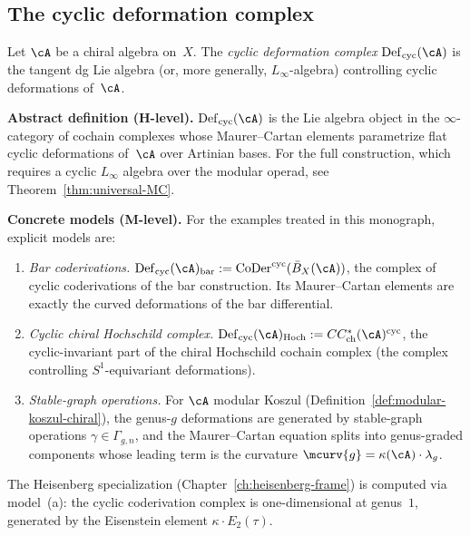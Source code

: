 \subsection{The cyclic deformation complex}
\label{subsec:cyclic-deformation}

\begin{definition}
\label{def:cyclic-deformation-elementary}
Let $\cA$ be a chiral algebra on~$X$.  The \emph{cyclic deformation
complex} $\operatorname{Def}_{\mathrm{cyc}}(\cA)$ is the tangent dg
Lie algebra (or, more generally, $L_\infty$-algebra) controlling
cyclic deformations of~$\cA$.

\smallskip\noindent
\textbf{Abstract definition (H-level).}
$\operatorname{Def}_{\mathrm{cyc}}(\cA)$ is the Lie algebra object in
the $\infty$-category of cochain complexes whose Maurer--Cartan
elements parametrize flat cyclic deformations of~$\cA$ over
Artinian bases.  For the full construction, which requires a cyclic
$L_\infty$ algebra over the modular operad, see
Theorem~\ref{thm:universal-MC}.

\smallskip\noindent
\textbf{Concrete models (M-level).}
For the examples treated in this monograph, explicit models are:

\begin{enumerate}[label=\textup{(\alph*)}]
\item \emph{Bar coderivations.}
  $\operatorname{Def}_{\mathrm{cyc}}(\cA)_{\mathrm{bar}}
  := \operatorname{CoDer}^{\mathrm{cyc}}(\bar{B}_X(\cA))$,
  the complex of cyclic coderivations of the bar construction.
  Its Maurer--Cartan elements are exactly the curved deformations
  of the bar differential.
\item \emph{Cyclic chiral Hochschild complex.}
  $\operatorname{Def}_{\mathrm{cyc}}(\cA)_{\mathrm{Hoch}}
  := CC^*_{\mathrm{ch}}(\cA)^{\mathrm{cyc}}$,
  the cyclic-invariant part of the chiral Hochschild cochain complex
  (the complex controlling $S^1$-equivariant deformations).
\item \emph{Stable-graph operations.}
  For $\cA$ modular Koszul
  (Definition~\ref{def:modular-koszul-chiral}), the genus-$g$
  deformations are generated by stable-graph operations
  $\gamma \in \Gamma_{g,n}$, and the Maurer--Cartan equation
  splits into genus-graded components whose leading term is the
  curvature $\mcurv{g} = \kappa(\cA) \cdot \lambda_g$.
\end{enumerate}

The Heisenberg specialization (Chapter~\ref{ch:heisenberg-frame})
is computed via model~(a): the cyclic coderivation complex is
one-dimensional at genus~$1$, generated by the Eisenstein element
$\kappa \cdot E_2(\tau)$.
\end{definition}

